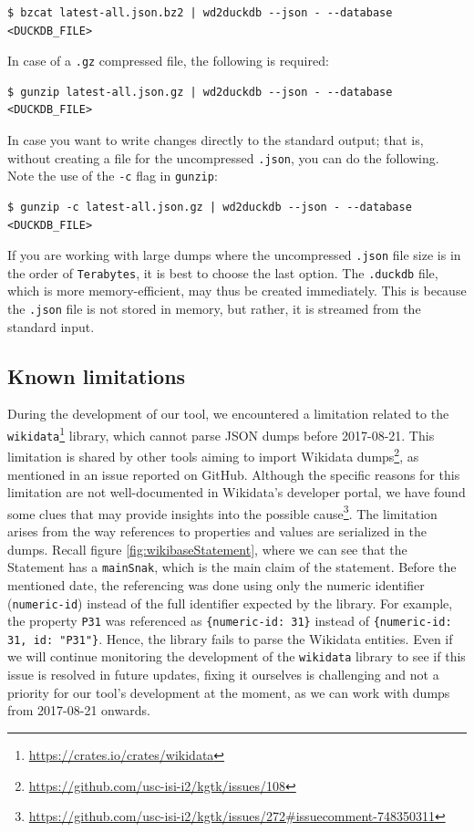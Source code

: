 \begin{verbatim}
$ bzcat latest-all.json.bz2 | wd2duckdb --json - --database <DUCKDB_FILE>
\end{verbatim}

In case of a \texttt{.gz} compressed file, the following is required:

\begin{verbatim}
$ gunzip latest-all.json.gz | wd2duckdb --json - --database <DUCKDB_FILE>
\end{verbatim}

In case you want to write changes directly to the standard output; that is, without creating a file for the uncompressed \texttt{.json}, you can do the following. Note the use of the \texttt{-c} flag in \texttt{gunzip}:

\begin{verbatim}
$ gunzip -c latest-all.json.gz | wd2duckdb --json - --database <DUCKDB_FILE>
\end{verbatim}

If you are working with large dumps where the uncompressed \texttt{.json} file size is in the order of \texttt{Terabytes}, it is best to choose the last option. The \texttt{.duckdb} file, which is more memory-efficient, may thus be created immediately. This is because the \texttt{.json} file is not stored in memory, but rather, it is streamed from the standard input.

\subsection{Known limitations}

During the development of our tool, we encountered a limitation related to the \texttt{wikidata}\footnote{\url{https://crates.io/crates/wikidata}} library, which cannot parse JSON dumps before 2017-08-21. This limitation is shared by other tools aiming to import Wikidata dumps\footnote{\url{https://github.com/usc-isi-i2/kgtk/issues/108}}, as mentioned in an issue reported on GitHub. Although the specific reasons for this limitation are not well-documented in Wikidata's developer portal, we have found some clues that may provide insights into the possible cause\footnote{\url{https://github.com/usc-isi-i2/kgtk/issues/272\#issuecomment-748350311}}. The limitation arises from the way references to properties and values are serialized in the dumps. Recall figure \ref{fig:wikibaseStatement}, where we can see that the Statement has a \texttt{mainSnak}, which is the main claim of the statement. Before the mentioned date, the referencing was done using only the numeric identifier (\texttt{numeric-id}) instead of the full identifier expected by the library. For example, the property \texttt{P31} was referenced as \texttt{\{numeric-id: 31\}} instead of \texttt{\{numeric-id: 31, id: "P31"\}}. Hence, the library fails to parse the Wikidata entities. Even if we will continue monitoring the development of the \texttt{wikidata} library to see if this issue is resolved in future updates, fixing it ourselves is challenging and not a priority for our tool's development at the moment, as we can work with dumps from 2017-08-21 onwards.